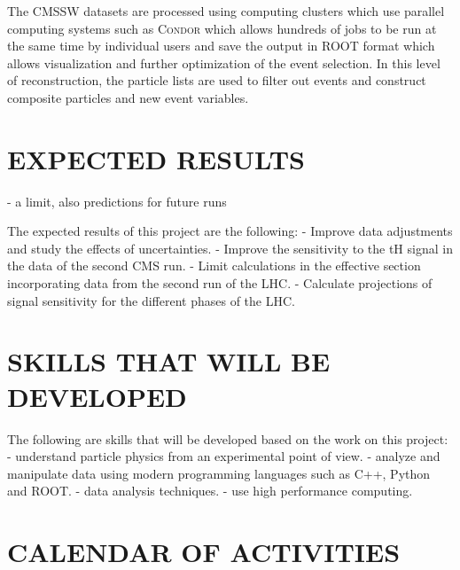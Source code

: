 \documentclass[final,3p]{CSP}
\begin{document}
The \textsc{CMSSW} datasets are processed using computing clusters which use parallel computing systems such as \textsc{Condor} which allows hundreds of jobs to be run at the same time by individual users and save the output in \textsc{ROOT} format which allows visualization and further optimization of the event selection.
In this level of reconstruction, the particle lists are used to filter out  events and construct composite particles  and new event variables.




\section{EXPECTED RESULTS}
- a limit, also predictions for future runs

The expected results of this project are the following:
- Improve data adjustments and study the effects of uncertainties.
- Improve the sensitivity to the tH signal in the data of the second CMS run.
- Limit calculations in the effective section incorporating data from the second run of the LHC.
- Calculate projections of signal sensitivity for the different phases of the LHC.



\section{SKILLS THAT WILL BE DEVELOPED}
The following are skills that will be developed based on the work on this project:
- understand particle physics from an experimental point of view.
- analyze and manipulate data using modern programming languages such as C++, Python and ROOT.
- data analysis techniques.
- use high performance computing.

\section{CALENDAR OF ACTIVITIES}



\cleardoublepage

\end{document}
